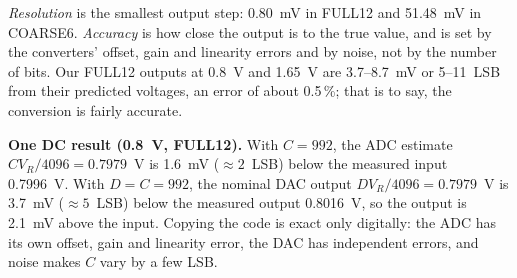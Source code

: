 \documentclass[11pt,a4paper]{article}
\begin{document}
\emph{Resolution} is the smallest output step: 0.80~mV in FULL12 and
51.48~mV in COARSE6. \emph{Accuracy} is how close the output is to the true
value, and is set by the converters' offset, gain and linearity errors and by
noise, not by the number of bits. Our FULL12 outputs at 0.8~V and 1.65~V are
3.7--8.7~mV or 5--11~LSB from their predicted voltages, an error of about
0.5\,\%; that is to say, the conversion is fairly accurate.

\textbf{One DC result (0.8~V, FULL12).} With $C = 992$, the ADC estimate
$C V_R/4096 = 0.7979$~V is 1.6~mV ($\approx 2$~LSB) below the measured input
0.7996~V. With $D = C = 992$, the nominal DAC output $D V_R/4096 = 0.7979$~V
is 3.7~mV ($\approx 5$~LSB) below the measured output 0.8016~V, so the output
is 2.1~mV above the input. Copying the code is exact only digitally: the ADC
has its own offset, gain and linearity error, the DAC has independent errors, and noise makes $C$ vary
by a few LSB.
\end{document}
